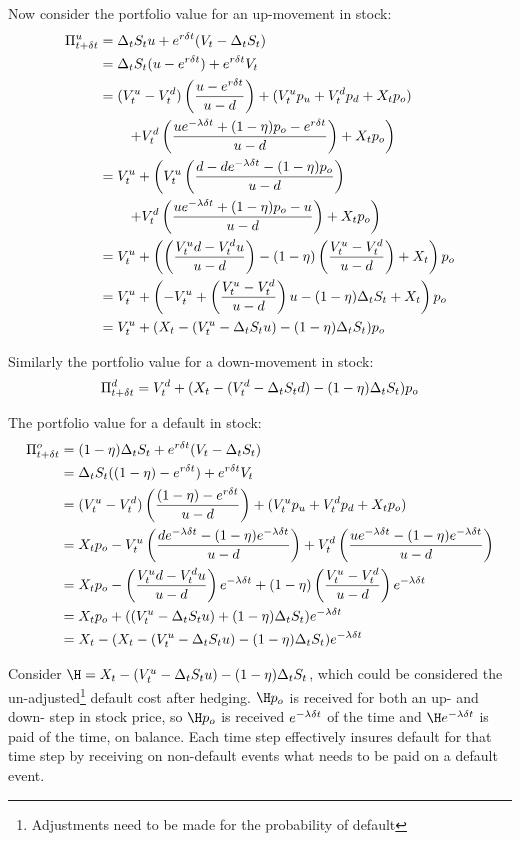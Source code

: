 \documentclass[a4paper,11pt,oneside]{report}
\theoremstyle{plain}
\theoremstyle{definition}
\begin{document}
Now consider the portfolio value for an up-movement in stock:
\begin{align}
 \PDt^u &= \D\S\u + e^{r\Dt}(\V - \D\S) \n
        &= \D\S(\u - e^{r\Dt}) + e^{r\Dt}\V \n
        &= (\Vu - \Vd)\left(\frac{\u - e^{r\Dt}}{u - d}\right) + (\Vu\pu + \Vd\pd + \X\po) \n
%
        &\qquad \left.+ \Vd\left(\frac{\u e^{-\lambda\Dt} + (1 - \eta)\po - e^{r\Dt}}{\u - \d}\right) + \X\po\right) \n
%
        &= \Vu + \left(\Vu\left(\frac{\d - \d e^{-\lambda\Dt} - (1 - \eta)\po}{\u - \d}\right)\right. \n
        &\qquad \left.+ \Vd\left(\frac{\u e^{-\lambda\Dt} + (1 - \eta)\po - \u}{\u - \d}\right) + \X\po\right) \n
%
        &= \Vu + \left(\left(\frac{\Vu\d - \Vd\u}{\u - \d}\right) - (1 - \eta)\left(\frac{\Vu - \Vd}{\u - \d}\right) + \X\right)\po \n
        &= \Vu + \left(-\Vu + \left(\frac{\Vu - \Vd}{\u - \d}\right)\u - (1 - \eta)\D\S + \X\right)\po \n
        &= \Vu + (\X - (\Vu  - \D\S\u) - (1 - \eta)\D\S)\po
\end{align}

Similarly the portfolio value for a down-movement in stock:
\begin{equation}
 \Pi_{t + \delta t}^d = V^{d}_t + (X_t - (V^{d}_t  - \Delta_tS_td) - (1 - \eta)\Delta_tS_t)p_o
\end{equation}

The portfolio value for a default in stock:
\begin{align}
 \Pi_{t + \delta t} ^o &= (1 - \eta)\Delta_tS_t + e^{r\delta t}(V_t - \Delta_tS_t) \nonumber\\
         &= \Delta_tS_t((1 - \eta) - e^{r\delta t}) + e^{r\delta t}V_t \nonumber\\
         &= (V^{u}_t - V^{d}_t)\left(\frac{(1 - \eta) - e^{r\delta t}}{u - d}\right) + (V^{u}_tp_u + V^{d}_tp_d + X_tp_o) \nonumber\\
         &= X_tp_o - V^{u}_t\left(\frac{d e^{-\lambda\delta t} - (1 - \eta)e^{-\lambda\delta t}}{u - d}\right) + V^{d}_t\left(\frac{u e^{-\lambda\delta t} - (1 - \eta)e^{-\lambda\delta t}}{u - d}\right) \nonumber\\
         &= X_tp_o - \left(\frac{V^{u}_td - V^{d}_tu}{u - d}\right)e^{-\lambda\delta t} + (1 - \eta)\left(\frac{V^{u}_t - V^{d}_t}{u - d}\right)e^{-\lambda\delta t} \nonumber\\
         &= X_tp_o + ((V^{u}_t - \Delta_tS_tu) + (1 - \eta)\Delta_tS_t)e^{-\lambda\delta t} \nonumber\\
         &= X_t - (X_t - (V^{u}_t - \Delta_tS_tu) - (1 - \eta)\Delta_tS_t)e^{-\lambda\delta t} \nonumber\\
\end{align}

Consider $\H = \X - (\Vu - \D\S\u) - (1 - \eta)\D\S$, which could be considered the un-adjusted\footnote{Adjustments need to be made for the probability of default} default cost after hedging.  $\H\po$ is received for both an up- and down- step in stock price, so $\H\po$ is received $e^{-\lambda\delta t}$ of the time and $\H e^{-\lambda\Dt}$ is paid \po of the time, on balance.  Each time step effectively insures default for that time step by receiving on non-default events what needs to be paid on a default event.
\end{document}
